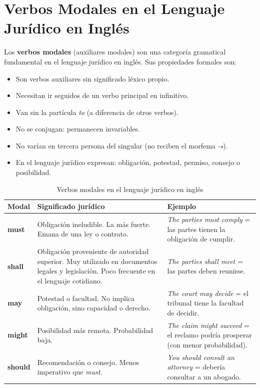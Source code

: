 \documentclass[12pt,oneside]{book}
\begin{document}
\section{Verbos Modales en el Lenguaje Jurídico en Inglés}

Los \textbf{verbos modales} (auxiliares modales) son una categoría
gramatical fundamental en el lenguaje jurídico en inglés. Sus propiedades
formales son:

\begin{itemize}
    \item Son verbos auxiliares sin significado léxico propio.
    \item Necesitan ir seguidos de un verbo principal en infinitivo.
    \item Van sin la partícula \textit{to} (a diferencia de otros verbos).
    \item No se conjugan: permanecen invariables.
    \item No varían en tercera persona del singular (no reciben el morfema
    \textit{-s}).
    \item En el lenguaje jurídico expresan: obligación, potestad, permiso,
    consejo o posibilidad.
\end{itemize}

\begin{table}[H]
\centering
\caption{Verbos modales en el lenguaje jurídico en inglés}
\begin{tabularx}{\textwidth}{
    >{\raggedright\arraybackslash}p{}
    >{\raggedright\arraybackslash}p{}
    >{\raggedright\arraybackslash}X
}
\toprule
\textbf{Modal} & \textbf{Significado jurídico} & \textbf{Ejemplo} \\
\midrule
\textbf{must} & Obligación ineludible. La más fuerte. Emana de una ley o contrato. & \textit{The parties must comply} = las partes tienen la obligación de cumplir. \\
\addlinespace
\textbf{shall} & Obligación proveniente de autoridad superior. Muy utilizado en documentos legales y legislación. Poco frecuente en el lenguaje cotidiano. & \textit{The parties shall meet} = las partes deben reunirse. \\
\addlinespace
\textbf{may} & Potestad o facultad. No implica obligación, sino capacidad o derecho. & \textit{The court may decide} = el tribunal tiene la facultad de decidir. \\
\addlinespace
\textbf{might} & Posibilidad más remota. Probabilidad baja. & \textit{The claim might succeed} = el reclamo podría prosperar (con menor probabilidad). \\
\addlinespace
\textbf{should} & Recomendación o consejo. Menos imperativo que \textit{must}. & \textit{You should consult an attorney} = debería consultar a un abogado. \\
\bottomrule
\end{tabularx}
\end{table}
\end{document}
